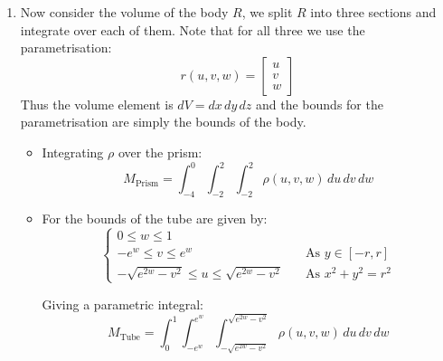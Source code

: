 \documentclass[a4paper, 11pt]{article}
\begin{document}
\begin{enumerate}[label=(\alph*)]
	      \pagebreak
	\item Now consider the volume of the body $R$, we split $R$ into three sections and integrate over each of them. Note that for all three we use the parametrisation:
	      $$r(u,v,w)=\begin{bmatrix}
			      u \\v\\w
		      \end{bmatrix}$$
	      Thus the volume element is $dV=dx\,dy\,dz$ and the bounds for the parametrisation are simply the bounds of the body.
	      \begin{itemize}
		      \item Integrating $\rho$ over the prism:
		            \[
			            M_\text{Prism}=\int_{-4}^0\int_{-2}^2\int_{-2}^2\rho(u,v,w)\,d u \,d v \,d w
		            \]
		      \item For the bounds of the tube are given by:
		            $$\begin{cases}
				            0\leq w\leq 1                                                                  \\
				            -e^w\leq v \leq e^w                             & \quad\text{As $y\in[-r,r]$}  \\
				            -\sqrt{e^{2w}-v^2}\leq u \leq \sqrt{e^{2w}-v^2} & \quad\text{As $x^2+y^2=r^2$}
			            \end{cases}$$

		            Giving a parametric integral:
		            $$M_\text{Tube}=\int_0^1\int_{-e^w}^{e^w}\int_{-\sqrt{e^{2w}-v^2}}^{\sqrt{e^{2w}-v^2}}\rho(u,v,w)\,d u \,d v \,d w$$


\end{itemize}
\end{enumerate}
\end{document}
